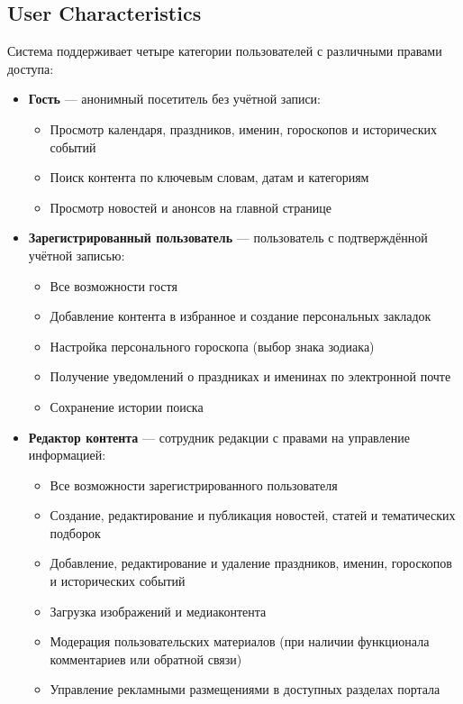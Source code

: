 \subsection{User Characteristics}
Система поддерживает четыре категории пользователей с различными правами доступа:
\begin{itemize}[leftmargin=*]
    \item \textbf{Гость} — анонимный посетитель без учётной записи:
    \begin{itemize}
        \item Просмотр календаря, праздников, именин, гороскопов и исторических событий
        \item Поиск контента по ключевым словам, датам и категориям
        \item Просмотр новостей и анонсов на главной странице
    \end{itemize}
    \item \textbf{Зарегистрированный пользователь} — пользователь с подтверждённой учётной записью:
    \begin{itemize}
        \item Все возможности гостя
        \item Добавление контента в избранное и создание персональных закладок
        \item Настройка персонального гороскопа (выбор знака зодиака)
        \item Получение уведомлений о праздниках и именинах по электронной почте
        \item Сохранение истории поиска
    \end{itemize}
    \item \textbf{Редактор контента} — сотрудник редакции с правами на управление информацией:
    \begin{itemize}
        \item Все возможности зарегистрированного пользователя
        \item Создание, редактирование и публикация новостей, статей и тематических подборок
        \item Добавление, редактирование и удаление праздников, именин, гороскопов и исторических событий
        \item Загрузка изображений и медиаконтента
        \item Модерация пользовательских материалов (при наличии функционала комментариев или обратной связи)
        \item Управление рекламными размещениями в доступных разделах портала

\end{itemize}
\end{itemize}
